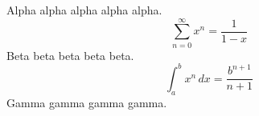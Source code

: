 \documentclass[11pt]{article}
\begin{document}
Alpha alpha alpha alpha alpha.
\[ \sum_{n=0}^{\infty} x^n = \frac{1}{1-x} \]
Beta beta beta beta beta.
\[ \int_a^b x^n \, dx = \frac{b^{n+1}}{n+1} \]
Gamma gamma gamma gamma.
\end{document}
